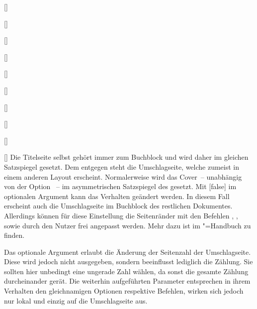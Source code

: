 \begin{Declaration}
\begin{Declaration}[v2.02]{%
  []%
}
\begin{Declaration}{[\PBoolean]}
\begin{Declaration}[v2.02]{[\PSet]}{%
}
\begin{Declaration}[v2.03]{[\PSet]}{%
}
\begin{Declaration}[v2.03]{[\PSet]}{%
}
\begin{Declaration}[v2.03]{%
  []%
}{}
\begin{Declaration}[v2.03]{%
  []
}{}
\begin{Declaration}[v2.03]{[\PSet]}{%
}
\begin{Declaration}[v2.03]{[\PSet]}{%
}
\begin{Declaration}[v2.03]{[\PSet]}{%
}
Die Titelseite selbst gehört immer zum Buchblock und wird daher im gleichen 
Satzspiegel gesetzt. Dem entgegen steht die Umschlagseite, welche zumeist in 
einem anderen Layout erscheint. Normalerweise wird das Cover~-- unabhängig von 
der Option ~-- im asymmetrischen Satzspiegel des \CDs 
gesetzt. Mit [false] im optionalen Argument 
kann das Verhalten geändert werden. In diesem Fall erscheint auch die 
Umschlagseite im Buchblock des restlichen Dokumentes. Allerdings können für 
diese Einstellung die Seitenränder mit den Befehlen , 
,  sowie 
 durch den Nutzer frei angepasst werden. Mehr dazu 
ist im \KOMAScript"=Handbuch \scrguide zu finden.

Das optionale Argument erlaubt die Änderung der Seitenzahl der Umschlagseite. 
Diese wird jedoch nicht ausgegeben, sondern beeinflusst lediglich die Zählung. 
Sie sollten hier unbedingt eine ungerade Zahl wählen, da sonst die gesamte 
Zählung durcheinander gerät. Die weiterhin aufgeführten Parameter entsprechen 
in ihrem Verhalten den gleichnamigen Optionen respektive Befehlen, wirken sich 
jedoch nur lokal und einzig auf die Umschlagseite aus.

\end{Declaration}
\end{Declaration}
\end{Declaration}
\end{Declaration}
\end{Declaration}
\end{Declaration}
\end{Declaration}
\end{Declaration}
\end{Declaration}
\end{Declaration}
\end{Declaration}

